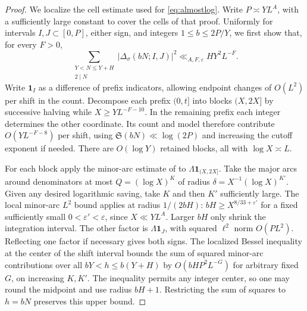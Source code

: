 \documentclass[11pt,a4paper]{article}
\numberwithin{equation}{section}
\newcommand{\SSS}{\mathfrak S}
\begin{document}
\begin{proof}
We localize the cell estimate used for \eqref{eq:almostlog}.
Write $P\asymp YL^A$, with a sufficiently large constant to cover
the cells of that proof. Uniformly for intervals $I,J\subset[0,P]$,
either sign, and integers $1\le b\le 2P/Y$, we first show that,
for every $F>0$,
\begin{equation}
 \sum_{\substack{Y<N\le Y+H\\2\mid N}}
     |\Delta_\sigma(bN;I,J)|^2
       \ll_{A,F,\varepsilon} HY^2L^{-F}.
 \label{eq:local-cell-correlation}
\end{equation}
Write $\mathbf1_I$ as a difference of prefix indicators, allowing
endpoint changes of $O(L^2)$ per shift in the count.
Decompose each prefix $(0,t]$ into blocks $(X,2X]$ by successive
halving while $X\ge YL^{-F-10}$. In the remaining prefix each
integer determines the other coordinate. Its count and model
therefore contribute $O(YL^{-F-8})$ per shift, using
$\SSS(bN)\ll\log(2P)$ and increasing the cutoff exponent if needed.
There are $O(\log Y)$ retained blocks, all with $\log X\asymp L$.

For each block apply the minor-arc estimate of
\cite[Proposition~3.4 and the deduction of Theorem~1.3]{MRTLong}
to $\Lambda\mathbf1_{(X,2X]}$. Take the major arcs around
denominators at most $Q=(\log X)^K$ of radius
$\delta=X^{-1}(\log X)^{K'}$. Given any desired logarithmic
saving, take $K$ and then $K'$ sufficiently large. The local
minor-arc $L^2$ bound applies at radius $1/(2bH)$:
$bH\ge X^{8/33+\varepsilon'}$ for a fixed sufficiently small
$0<\varepsilon'<\varepsilon$, since $X\ll Y L^A$.
Larger $bH$ only shrink the integration interval. The other
factor is $\Lambda\mathbf1_J$, with squared $\ell^2$ norm
$O(P L^2)$. Reflecting one factor if necessary gives both signs.
The localized Bessel inequality
\cite[proof of Corollary~3.2]{MRTLong} at the center of the
shift interval bounds the sum of squared minor-arc contributions
over all $bY<h\le b(Y+H)$ by $O(bH P^2 L^{-G})$ for arbitrary
fixed $G$, on increasing $K,K'$. The inequality permits any
integer center, so one may round the midpoint and use radius
$bH+1$. Restricting the sum of squares to $h=bN$ preserves
this upper bound.


\end{proof}
\end{document}

